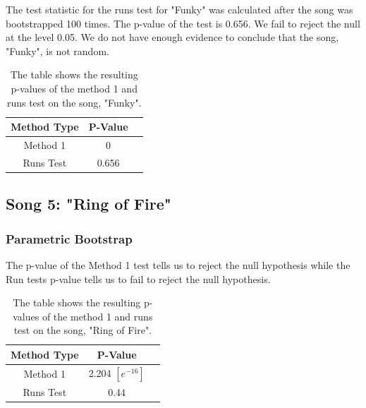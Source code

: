 \documentclass[12pt, letterpaper]{article}
\begin{document}
The test statistic for the runs test for "Funky" was calculated after the song was bootstrapped 100 times. The p-value of the test is 0.656. We fail to reject the null at the level 0.05. We do not have enough evidence to conclude that the song, "Funky", is not random.
\begin{table}[h]
\begin{center}
\begin{tabular}{|c|c|c|}
\hline
\textbf{Method Type} & P-Value \\
\hline
Method 1 & 0  \\
\hline
Runs Test & 0.656 \\ 
\hline
\end{tabular}
\end{center}
\caption{The table shows the resulting p-values of the method 1 and runs test on the song, "Funky".}
\label{fig: P-values for "Funky": Nonparametric Bootstrap}
\end{table}

\subsection{Song 5: "Ring of Fire"}
\subsubsection{Parametric Bootstrap}
The p-value of the Method 1 test tells us to reject the null hypothesis while the Run tests p-value tells us to fail to reject the null hypothesis.
\begin{table}[h]
\begin{center}
\begin{tabular}{|c|c|c|}
\hline
\textbf{Method Type} & P-Value  \\
\hline
Method 1 & 2.204 $[e^{-16}]$ \\
\hline
Runs Test & 0.44 \\ 
\hline
\end{tabular}
\end{center}
\caption{The table shows the resulting p-values of the method 1 and runs test on the song, "Ring of Fire".}
\label{fig: P-values for "Ring of Fire": Parametric Bootstrap}
\end{table}
\end{document}
